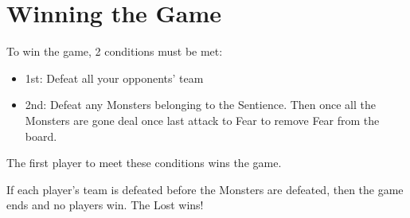 \documentclass[../main.tex]{subfiles}
\begin{document}
\section{Winning the Game}

To win the game, 2 conditions must be met: 

\begin{itemize}
    \item 1st: Defeat all your opponents' team
    \item 2nd: Defeat any Monsters belonging to the Sentience. Then once all the Monsters are gone deal once last attack to Fear to remove Fear from the board. 
\end{itemize}

The first player to meet these conditions wins the game. 

If each player's team is defeated before the Monsters are defeated, then the game ends and no players win. The Lost wins! 

\clearpage
\end{document}
